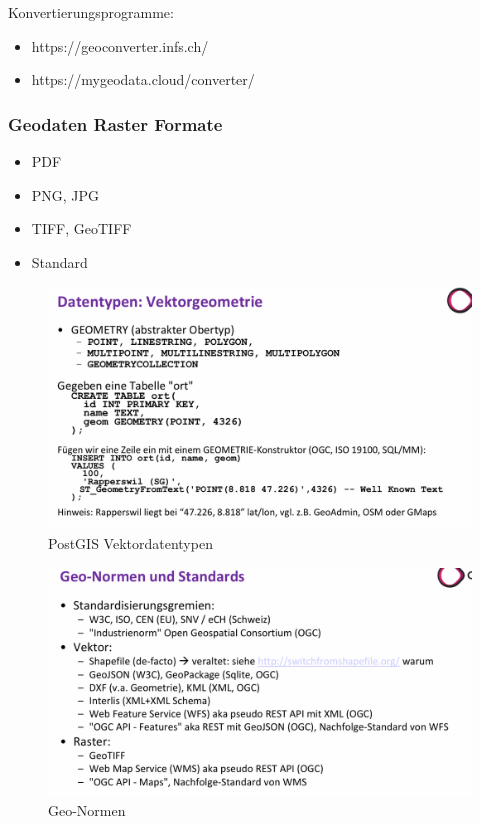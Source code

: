 \documentclass[../Main.tex]{subfiles}
\begin{document}
Konvertierungsprogramme:
\begin{itemize}
    \item https://geoconverter.infs.ch/
    \item https://mygeodata.cloud/converter/
\end{itemize}

\subsubsection{Geodaten Raster Formate}
\begin{itemize}
    \item PDF
    \item PNG, JPG
    \item TIFF, GeoTIFF
        \item Standard
\end{itemize}

\begin{figure}[H]
    \centering
    \includegraphics[width=0.75\linewidth]{Images/postgis-vektordatentypen.png}
    \caption{PostGIS Vektordatentypen}
\end{figure}

\begin{figure}[H]
    \centering
    \includegraphics[width=0.75\linewidth]{Images/geonormen.png}
    \caption{Geo-Normen}
\end{figure}
\end{document}
